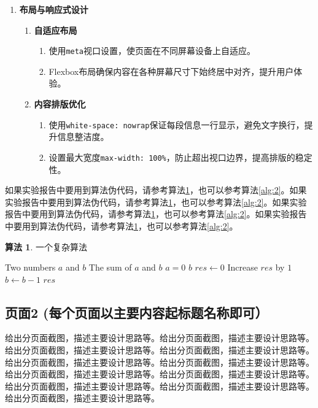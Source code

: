 \documentclass[supercite]{Experimental_Report}
\theoremstyle{definition}
\newtheorem{alg}{算法}[section]
\begin{document}
\begin{enumerate}
    \item \textbf{布局与响应式设计}
    \begin{enumerate}
        \item \textbf{自适应布局}
        \begin{enumerate}
            \item 使用\texttt{meta}视口设置，使页面在不同屏幕设备上自适应。
            \item Flexbox布局确保内容在各种屏幕尺寸下始终居中对齐，提升用户体验。
        \end{enumerate}
        
        \item \textbf{内容排版优化}
        \begin{enumerate}
            \item 使用\texttt{white-space: nowrap}保证每段信息一行显示，避免文字换行，提升信息整洁度。
            \item 设置最大宽度\texttt{max-width: 100\%}，防止超出视口边界，提高排版的稳定性。
        \end{enumerate}
    \end{enumerate}
\end{enumerate}
如果实验报告中要用到算法伪代码，请参考算法\ref{alg:1}，也可以参考算法\ref{alg:2}。如果实验报告中要用到算法伪代码，请参考算法\ref{alg:1}，也可以参考算法\ref{alg:2}。如果实验报告中要用到算法伪代码，请参考算法\ref{alg:1}，也可以参考算法\ref{alg:2}。如果实验报告中要用到算法伪代码，请参考算法\ref{alg:1}，也可以参考算法\ref{alg:2}。

\begin{shaded*}\begin{alg}{一个复杂算法}
		\label{alg:1}
		\begin{algorithmic}
			\Input Two numbers $a$ and $b$
			\Output The sum of $a$ and $b$
			\If $a = 0$
			\State \Return $b$
			\EndIf
			\State $res \gets 0$
			\State Increase $res$ by $1$
			\State $b \gets b - 1$
			\EndWhile
			\State \Return $res$
			\EndProcedure
		\end{algorithmic}
\end{alg}\end{shaded*}

\subsection{页面2 (每个页面以主要内容起标题名称即可）}

给出分页面截图，描述主要设计思路等。给出分页面截图，描述主要设计思路等。给出分页面截图，描述主要设计思路等。给出分页面截图，描述主要设计思路等。给出分页面截图，描述主要设计思路等。给出分页面截图，描述主要设计思路等。给出分页面截图，描述主要设计思路等。给出分页面截图，描述主要设计思路等。给出分页面截图，描述主要设计思路等。给出分页面截图，描述主要设计思路等。给出分页面截图，描述主要设计思路等。
\end{document}
